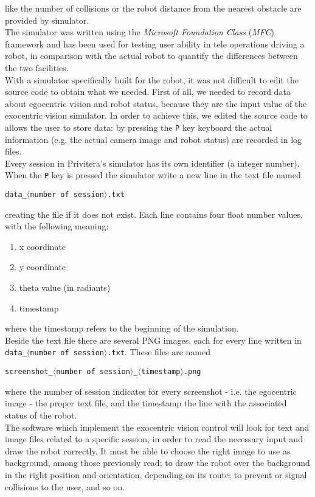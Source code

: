 like the number of collisions or the robot distance from the 
nearest obstacle are provided by simulator.
\\
The simulator was written using the \textit{Microsoft Foundation Class}
(\textit{MFC}) framework and has been used for testing user ability in
tele operations driving a robot, in comparison with the actual 
robot to quantify the differences between the two facilities. 
\\
With a simulator specifically built for the \morduc{} robot, it 
was not difficult to edit the source code to obtain what we 
needed. First of all, we needed to record data about egocentric 
vision and robot status, because they are the input value 
of the exocentric vision simulator. In order to achieve this, 
we edited the source code to allows the user to store data: by 
pressing the \texttt{P} key keyboard the actual information (e.g. the 
actual camera image and robot status) are recorded in log files.
\\
Every session in Privitera's simulator has its own identifier 
(a integer number). When the \texttt{P} key is pressed the simulator 
write a new line in the text file named

\begin{center}
  \texttt{data\_$\langle$number of session$\rangle$.txt}
\end{center}

creating the file if it does not 
exist. Each line contains four float number values, with the 
following meaning:

\begin{enumerate}
\item x coordinate
\item y coordinate
\item theta value (in radiants)
\item timestamp
\end{enumerate}

where the timestamp refers to the beginning of the simulation.
\\
Beside the text file there are several PNG images, each for every 
line written in \texttt{data\_$\langle$number of 
session$\rangle$.txt}.
These files are named

\begin{center}
  \texttt{screenshot\_$\langle$number of 
    session$\rangle$\_$\langle$timestamp$\rangle$.png}
\end{center}

where the 
number of session indicates for every screenshot 
- i.e. the egocentric image - the proper text file, and the 
timestamp the line with the associated status of the robot.
\\
The software which implement the exocentric vision control 
will look for text and image files related to a specific 
session, in order to read the necessary input and draw the 
robot correctly. It must be able to choose the right image 
to use as background, among those previously read; to draw 
the robot over the background in the right position and 
orientation, depending on its route; to prevent or signal 
collisions to the user, and so on.
